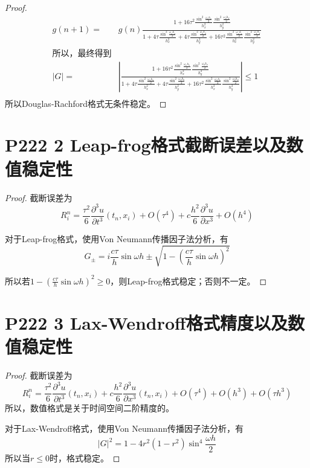 \documentclass{article}%
\begin{document}
\begin{proof}
\begin{align*}
    g(n+1)=&g(n)\frac{1+16\tau^2\frac{\sin ^2\frac{\omega_xh_x}{2}}{h^2_x}\frac{\sin ^2\frac{\omega_yh_y}{2}}{h^2_y}}{1+4\tau \frac{\sin ^2\frac{\omega_xh_x}{2}}{h^2_x}+4\tau  \frac{\sin ^2\frac{\omega_yh_y}{2}}{h^2_y}+16\tau^2\frac{\sin ^2\frac{\omega_xh_x}{2}}{h^2_x}\frac{\sin ^2\frac{\omega_yh_y}{2}}{h^2_y}}\\
		\text{所以，最终得到}\\
		\left |G  \right |=&\left |\frac{1+16\tau^2\frac{\sin ^2\frac{\omega_xh_x}{2}}{h^2_x}\frac{\sin ^2\frac{\omega_yh_y}{2}}{h^2_y}}{1+4\tau \frac{\sin ^2\frac{\omega_xh_x}{2}}{h^2_x}+4\tau  \frac{\sin ^2\frac{\omega_yh_y}{2}}{h^2_y}+16\tau^2\frac{\sin ^2\frac{\omega_xh_x}{2}}{h^2_x}\frac{\sin ^2\frac{\omega_yh_y}{2}}{h^2_y}}  \right | \leq 1\\
\end{align*}
    所以Douglas-Rachford格式无条件稳定。
\end{proof}

\section{P222 2 Leap-frog格式截断误差以及数值稳定性}

\begin{proof}
截断误差为$$ R^n_i=\frac{\tau^2}{6}\frac{\partial^3u}{\partial t^3}(t_n,x_i)+O(\tau^4)+c\frac{h^2}{6}\frac{\partial^3u}{\partial x^3}+O(h^4) $$

对于Leap-frog格式，使用Von Neumann传播因子法分析，有$$ G_\pm =i\frac{c\tau}{h}\sin \omega h \pm \sqrt{1-(\frac{c\tau}{h}\sin \omega h)^2} $$

    所以若$ 1-(\frac{c\tau}{h}\sin \omega h)^2 \geq 0 $，则Leap-frog格式稳定；否则不一定。
\end{proof}

\section{P222 3 Lax-Wendroff格式精度以及数值稳定性}

\begin{proof}
截断误差为$$ R^n_i = \frac{\tau^2}{6}\frac{\partial ^3u}{\partial t^3}(t_n,x_i)+c\frac{h^2}{6}\frac{\partial ^3u}{\partial x^3}(t_n,x_i)+O(\tau^4)+O(h^3)+O(\tau h^3) $$
所以，数值格式是关于时间空间二阶精度的。

对于Lax-Wendroff格式，使用Von Neumann传播因子法分析，有$$ \left |G  \right |^2=1-4r^2\left (1-r^2  \right )\sin^4\frac{\omega h}{2} $$
所以当$ r \leq 0 $时，格式稳定。
\end{proof}
\end{document}
